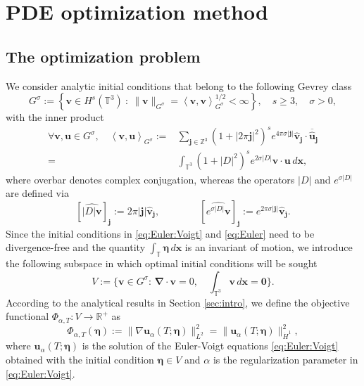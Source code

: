 \documentclass[leqno,10pt,a4paper]{amsart}
\theoremstyle{definition}
\numberwithin{equation}{section}
\newcommand{\mbb}[1]{\mathbb{#1}}
\newcommand{\la}{\langle}
\newcommand{\ra}{\rangle}
\newcommand{\bds}{\boldsymbol}
\def\bnabla{\boldsymbol{\nabla}}
\def\u{\boldsymbol{u}}
\def\vv{\boldsymbol{v}}
\def\x{\boldsymbol{x}}
\def\bbeta{\boldsymbol{\eta}}
\def\TT{\mathbb{T}}
\begin{document}
 
\section{PDE optimization method}

\subsection{The optimization problem}


We consider analytic initial conditions that belong to the following Gevrey class
\begin{equation}
G^\sigma := \left\{ \vv \in H^s(\TT^3) \ : \ \| \vv \|_{G^\sigma} = \left\langle \vv,\vv \right\rangle^{1/2}_{G^\sigma} < \infty \right\}, \quad s \geq 3, \quad \sigma > 0,
\label{eq:G}
\end{equation}
with the inner product
\begin{equation}\label{eq:Gevrey:def}
\begin{aligned}
\forall \bds v, \bds u\in G^{\sigma}, \quad 
\left\la\bds v, \bds u \right\ra_{G^{\sigma}} 
:= &\sum_{\bds j \in \mathbb Z^3} 
(1+|2\pi\bds j|^2)^s e^{4\pi\sigma|\bds j|} \hat{\bds v}_{\bds j} \cdot \overline{\hat{\bds u}}_{\bds j}\\
=& \int_{\mbb T^3}(1+|D|^2)^s e^{2\sigma|D|} \bds v \cdot \bds u \, d\bds x,
\end{aligned}
\end{equation}
where overbar denotes complex conjugation, whereas the operators $|D|$
and $e^{\sigma|D|}$ are defined via
%
\begin{equation}
\left[\widehat{|D| \bds v}\right]_{\bds j} := 2\pi|\bds j| \hat{\bds v}_{\bds j}, \qquad \qquad 
\left[\widehat{e^{\sigma |D|}\bds v}\right]_{\bds j} := e^{2\pi\sigma|\bds j|}\hat{\bds v}_{\bds j}.
\label{eq:D}
\end{equation}
Since the initial conditions in \eqref{eq:Euler:Voigt} and \eqref{eq:Euler} need to
be divergence-free and the quantity $\int_{\TT} \bbeta \, d\x$ is an
invariant of motion, we introduce the following subspace in which
optimal initial conditions will be sought
%
\begin{equation}\label{eq:space:initial:condition}
V := \{ \bds v  \in G^{\sigma}: \,
\bnabla \cdot \bds v = 0, \quad \int_{\mbb T^3} \bds v \, d \bds x= \bds 0\}.
\end{equation}
%
According to the analytical results in Section \ref{sec:intro}, we define the objective functional $\Phi_{\alpha, T}: V \to \mbb R^+$ as
%
\begin{equation}\label{eq:obj}
\Phi_{\alpha, T}(\bbeta) := \| \nabla\u_\alpha(T; \bbeta) \|^2_{L^2} 
= \| \u_\alpha(T; \bbeta) \|^2_{\dot{H}^1},
\end{equation}
%
where $\u_\alpha(T;\bbeta)$ is the solution of the Euler-Voigt equations
\eqref{eq:Euler:Voigt} obtained with the initial condition $\bbeta \in V$ and $\alpha$ is the regularization parameter in \eqref{eq:Euler:Voigt}. 
\end{document}
